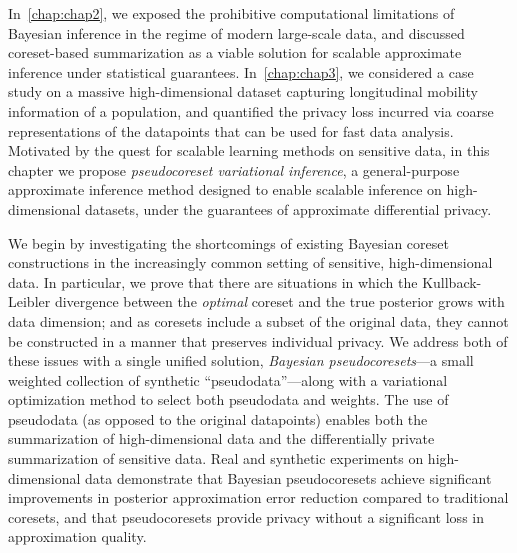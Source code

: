 In~\cref{chap:chap2}, we exposed the prohibitive computational limitations of Bayesian inference in the regime of modern large-scale data, and discussed coreset-based summarization as a viable solution for scalable approximate inference under statistical guarantees. In~\cref{chap:chap3}, we considered a case study on a massive high-dimensional dataset capturing longitudinal mobility information of a population, and quantified the privacy loss incurred via coarse representations of the datapoints that can be used for fast data analysis.
Motivated by the quest for scalable learning methods on sensitive data, in this chapter we propose \emph{pseudocoreset  variational inference}, a general-purpose approximate inference method designed to enable scalable inference on high-dimensional datasets, under the guarantees of approximate differential privacy.

We begin by investigating the shortcomings of existing Bayesian coreset constructions 
in the increasingly common setting of sensitive, high-dimensional data. 
In particular, we prove that there are situations in which 
the Kullback-Leibler divergence between the \emph{optimal} coreset 
and the true posterior grows with data dimension; and as coresets include
a subset of the original data, they cannot be constructed in a manner
that preserves individual privacy.
We address both of these issues with a single unified solution, \emph{Bayesian
pseudocoresets}---a small weighted collection of synthetic
``pseudodata''---along with a variational optimization method to select both
pseudodata and weights.  The use of pseudodata (as opposed to
the original datapoints) enables both the summarization of high-dimensional data
and the  differentially private summarization of
sensitive data. Real and
synthetic experiments on high-dimensional data demonstrate that Bayesian 
pseudocoresets achieve significant improvements in posterior approximation error reduction compared to
traditional coresets, and that pseudocoresets provide privacy without
a significant loss in approximation quality. 


